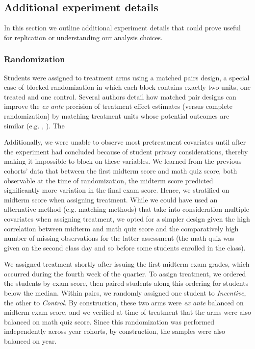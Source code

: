 \documentclass[12pt]{article}
\begin{document}
\subsection{Additional experiment details}

In this section we outline additional experiment details that could prove useful for replication or understanding our analysis choices.

\subsubsection{Randomization} \label{a_randomization}
Students were assigned to treatment arms using a matched pairs design, a special case of blocked randomization in which each block contains exactly two units, one treated and one control. Several authors detail how matched pair designs can improve the \textit{ex ante} precision of treatment effect estimates (versus complete randomization) by matching treatment units whose potential outcomes are similar (e.g. \cite{ir2015}, \cite{ai2017}). The

Additionally, we were unable to observe most pretreatment covariates until after the experiment had concluded because of student privacy considerations, thereby making it impossible to block on these variables. We learned from the previous cohorts' data that between the first midterm score and math quiz score, both observable at the time of randomization, the midterm score predicted significantly more variation in the final exam score. Hence, we stratified on midterm score when assigning treatment. While we could have used an alternative method (e.g. matching methods) that take into consideration multiple covariates when assigning treatment, we opted for a simpler design given the high correlation between midterm and math quiz score and the comparatively high number of missing observations for the latter assessment (the math quiz was given on the second class day and so before some students enrolled in the class).

We assigned treatment shortly after issuing the first midterm exam grades, which occurred during the fourth week of the quarter. To assign treatment, we ordered the students by exam score, then paired students along this ordering for students below the median. Within pairs, we randomly assigned one student to \textit{Incentive}, the other to \textit{Control}. By construction, these two arms were \textit{ex ante} balanced on midterm exam score, and we verified at time of treatment that the arms were also balanced on math quiz score. Since this randomization was performed independently across year cohorts, by construction, the samples were also balanced on year.
\end{document}
